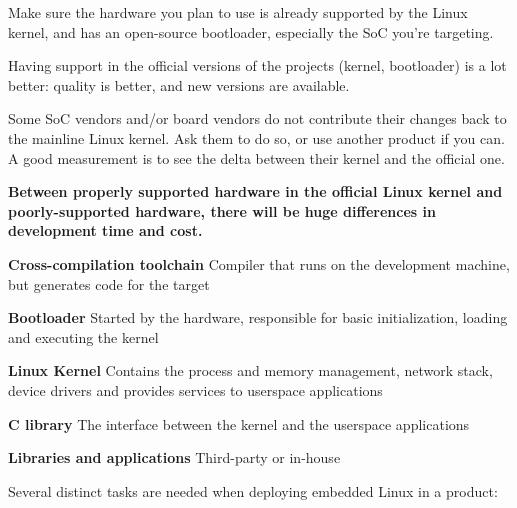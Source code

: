 \startitemize
\item Make sure the hardware you plan to use is already supported by
  the Linux kernel, and has an open-source bootloader, especially
  the SoC you’re targeting.
\item Having support in the official versions of the projects
  (kernel, bootloader) is a lot better: quality is better, and new
  versions are available.
\item Some SoC vendors and/or board vendors do not contribute their
  changes back to the mainline Linux kernel. Ask them to do so, or
  use another product if you can. A good measurement is to see the
  delta between their kernel and the official one.
\item {\bf Between properly supported hardware in the official Linux
  kernel and poorly-supported hardware, there will be huge
  differences in development time and cost.}
\stopitemize





  \startitemize
  \item {\bf Cross-compilation toolchain}
    Compiler that runs on the development machine, but generates
    code for the target
  \item {\bf Bootloader}
    Started by the hardware, responsible for basic
      initialization, loading and executing the kernel
  \item {\bf Linux Kernel}
    Contains the process and memory management, network stack,
      device drivers and provides services to userspace applications
  \item {\bf C library}
    The interface between the kernel and the userspace
      applications
  \item {\bf Libraries and applications}
     Third-party or in-house
  \stopitemize


  Several distinct tasks are needed when deploying embedded Linux in a
  product:


